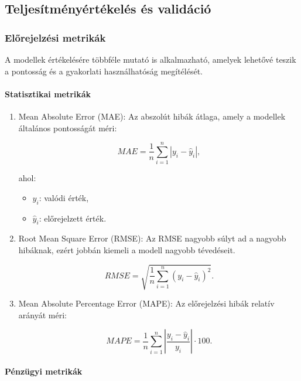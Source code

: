 \documentclass[11pt]{article}
\providecommand{\tightlist}{%
      \setlength{\itemsep}{0pt}\setlength{\parskip}{0pt}}
\begin{document}
\subsection{Teljesítményértékelés és
validáció}\label{teljesuxedtmuxe9nyuxe9rtuxe9keluxe9s-uxe9s-validuxe1ciuxf3}

\subsubsection{Előrejelzési
metrikák}\label{elux151rejelzuxe9si-metrikuxe1k}

A modellek értékelésére többféle mutató is alkalmazható, amelyek
lehetővé teszik a pontosság és a gyakorlati használhatóság megítélését.

\paragraph{Statisztikai metrikák}\label{statisztikai-metrikuxe1k}

\begin{enumerate}
\def\labelenumi{\arabic{enumi}.}
\item
  Mean Absolute Error (MAE): Az abszolút hibák átlaga, amely a modellek
  általános pontosságát méri:

  \[MAE = \frac{1}{n} \sum_{i=1}^n |y_i - \hat{y}_i|,\]

  ahol:

  \begin{itemize}
  \tightlist
  \item
    \(y_i\): valódi érték,
  \item
    \(\hat{y}_i\): előrejelzett érték.
  \end{itemize}
\item
  Root Mean Square Error (RMSE): Az RMSE nagyobb súlyt ad a nagyobb
  hibáknak, ezért jobbán kiemeli a modell nagyobb tévedéseit.

  \[RMSE = \sqrt{\frac{1}{n} \sum_{i=1}^n (y_i - \hat{y}_i)^2}.\]
\item
  Mean Absolute Percentage Error (MAPE): Az előrejelzési hibák relatív
  arányát méri:

  \[MAPE = \frac{1}{n} \sum_{i=1}^n \left|\frac{y_i - \hat{y}_i}{y_i}\right| \cdot 100.\]
\end{enumerate}

\paragraph{Pénzügyi metrikák}\label{puxe9nzuxfcgyi-metrikuxe1k}
\end{document}
